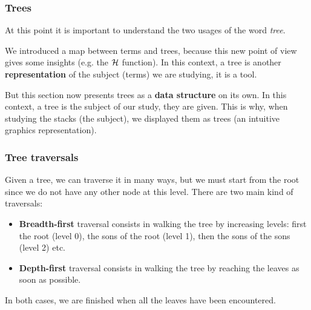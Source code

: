 
%
\begin{frame}
\frametitle{Trees}

At this point it is important to understand the two usages of the
word \emph{tree}. 

\bigskip

We introduced a map between terms and trees, because this new point of
view gives  some insights  (e.g. the \({\cal H}\) function).  In this
context,  a tree  is  another \textbf{representation}  of the  subject
(terms) we are studying, it is a tool.

\bigskip

But this section now presents trees as a \textbf{data structure} on
its own. In this context, a tree is the subject of our study, they are
given. This is why, when studying the stacks (the subject), we
displayed them as trees (an intuitive graphics representation).

\end{frame}

%
\begin{frame}
\frametitle{Tree traversals}

Given a tree, we can traverse it in many ways, but we must start from
the root since we do not have any other node at this level. There are
two main kind of traversals:
\begin{itemize}

  \item \textbf{Breadth-first} traversal consists in walking the
  tree by increasing levels: first the root (level 0), the sons of the
  root (level 1), then the sons of the sons (level 2) etc. 

  \item \textbf{Depth-first} traversal consists in walking the tree 
  by reaching the leaves as soon as possible.

\end{itemize}
In both cases, we are finished when all the leaves have been encountered.

\end{frame}

